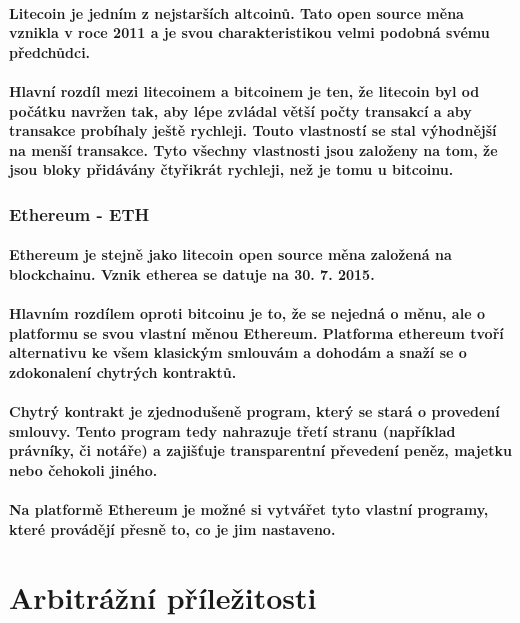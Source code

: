 \documentclass[thesis=B,czech]{FITthesis}[2019/03/21]
\begin{document}
\paragraph{
Litecoin je jedním z nejstarších altcoinů. Tato open source měna vznikla v roce 2011 a je svou charakteristikou velmi podobná svému předchůdci. 
}
\paragraph{
Hlavní rozdíl mezi litecoinem a bitcoinem je ten, že litecoin byl od počátku navržen tak, aby lépe zvládal větší počty transakcí a aby transakce probíhaly ještě rychleji. Touto vlastností se stal výhodnější na menší transakce. Tyto všechny vlastnosti jsou založeny na tom, že jsou bloky přidávány čtyřikrát rychleji, než je tomu u bitcoinu. \cite{litecoin}
}
\subsubsection{Ethereum - ETH}
\paragraph{
Ethereum je stejně jako litecoin open source měna založená na blockchainu. Vznik etherea se datuje na 30. 7. 2015. 
}
\paragraph{
Hlavním rozdílem oproti bitcoinu je to, že se nejedná o měnu, ale o platformu se svou vlastní měnou Ethereum. Platforma ethereum tvoří alternativu ke všem klasickým smlouvám a dohodám a snaží se o zdokonalení chytrých kontraktů. \cite{btc_vs_eth}
}
\paragraph{
Chytrý kontrakt je zjednodušeně program, který se stará o provedení smlouvy. Tento program tedy nahrazuje třetí stranu (například právníky, či notáře) a zajišťuje transparentní převedení peněz, majetku nebo čehokoli jiného. 
}
\paragraph{
Na platformě Ethereum je možné si vytvářet tyto vlastní programy, které provádějí přesně to, co je jim nastaveno. \cite{ethereum}
}
\section{Arbitrážní příležitosti}
\end{document}

